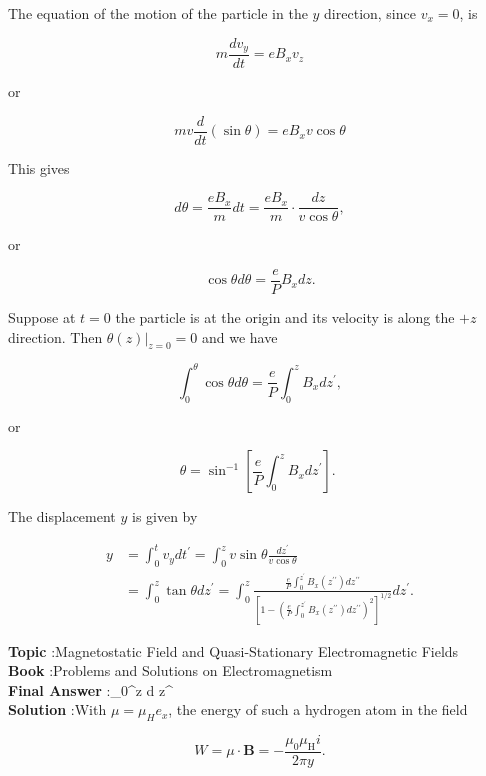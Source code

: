 \documentclass[10pt]{article}
\begin{document}
The equation of the motion of the particle in the $y$ direction, since $v_{x}=0$, is

$$
m \frac{d v_{y}}{d t}=e B_{x} v_{z}
$$

or

$$
m v \frac{d}{d t}(\sin \theta)=e B_{x} v \cos \theta
$$

This gives

$$
d \theta=\frac{e B_{x}}{m} d t=\frac{e B_{x}}{m} \cdot \frac{d z}{v \cos \theta},
$$

or

$$
\cos \theta d \theta=\frac{e}{P} B_{x} d z .
$$

Suppose at $t=0$ the particle is at the origin and its velocity is along the $+z$ direction. Then $\left.\theta(z)\right|_{z=0}=0$ and we have

$$
\int_{0}^{\theta} \cos \theta d \theta=\frac{e}{P} \int_{0}^{z} B_{x} d z^{\prime},
$$

or

$$
\theta=\sin ^{-1}\left[\frac{e}{P} \int_{0}^{z} B_{x} d z^{\prime}\right] \text {. }
$$

The displacement $y$ is given by

$$
\begin{aligned}
y &=\int_{0}^{t} v_{y} d t^{\prime}=\int_{0}^{z} v \sin \theta \frac{d z^{\prime}}{v \cos \theta} \\
&=\int_{0}^{z} \tan \theta d z^{\prime}=\int_{0}^{z} \frac{\frac{e}{P} \int_{0}^{z^{\prime}} B_{x}\left(z^{\prime \prime}\right) d z^{\prime \prime}}{\left[1-\left(\frac{e}{P} \int_{0}^{z^{\prime}} B_{x}\left(z^{\prime \prime}\right) d z^{\prime \prime}\right)^{2}\right]^{1 / 2}} d z^{\prime} .
\end{aligned}
$$


\textbf{Topic} :Magnetostatic Field and Quasi-Stationary Electromagnetic Fields\\
\textbf{Book} :Problems and Solutions on Electromagnetism\\
\textbf{Final Answer} :\int_{0}^{z}  d z^{\prime}\\


\textbf{Solution} :With $\mu=\mu_{H} e_{x}$, the energy of such a hydrogen atom in the field

$$
W=\mu \cdot \mathbf{B}=-\frac{\mu_{0} \mu_{\mathrm{H}} i}{2 \pi y} .
$$
\end{document}
